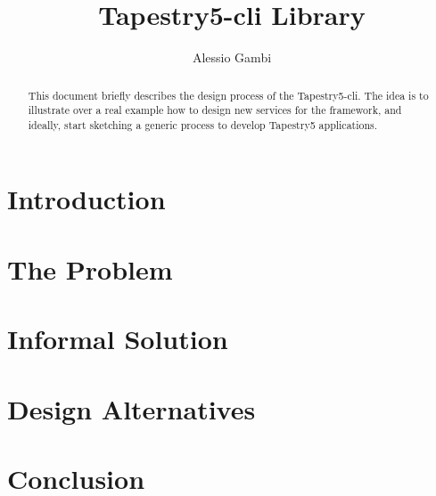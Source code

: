 \documentclass{article}
\newcommand{\tapcli}{Tapestry5-cli\xspace}
\begin{document}
\title{\tapcli Library}
\author{Alessio Gambi}

\maketitle

\begin{abstract}
This document briefly describes the design process of the \tapcli.
The idea is to illustrate over a real example how to design new services for the framework, and ideally, start sketching a generic process to develop Tapestry5 applications.
\end{abstract}

\section{Introduction}

\section{The Problem}

\section{Informal Solution}

\section{Design Alternatives}

\section{Conclusion}
\end{document}
